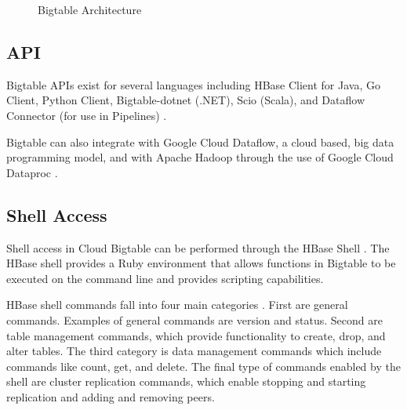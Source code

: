 \documentclass[9pt,twocolumn,twoside]{../../styles/osajnl}
\begin{document}
\begin{figure}[htbp]
\centering
{}
\caption{Bigtable Architecture \cite{www-bigtabledocoverview}}
\label{fig:bigtable-architecture}
\end{figure}

\subsection{API}

Bigtable APIs exist for several languages including HBase Client for Java, Go Client, Python Client, Bigtable-dotnet (.NET), Scio (Scala), and Dataflow Connector (for use in Pipelines) \cite{www-bigtabledocapi}.

Bigtable can also integrate with Google Cloud Dataflow, a cloud based, big data programming model, and with Apache Hadoop through the use of Google Cloud Dataproc \cite{www-bigtabledocapi}.

\subsection{Shell Access}


Shell access in Cloud Bigtable can be performed through the HBase Shell \cite{www-hbaseshell}. The HBase shell provides a Ruby environment that allows functions in Bigtable to be executed on the command line and provides scripting capabilities. 

HBase shell commands fall into four main categories \cite{www-hbaseshell2}.  First are general commands.  Examples of general commands are version and status.  Second are table management commands, which provide functionality to create, drop, and alter tables.  The third category is data management commands which include commands like count, get, and delete.  The final type of commands enabled by the shell are cluster replication commands, which enable stopping and starting replication and adding and removing peers.
\end{document}
